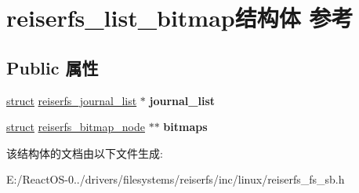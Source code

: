 \hypertarget{structreiserfs__list__bitmap}{}\section{reiserfs\+\_\+list\+\_\+bitmap结构体 参考}
\label{structreiserfs__list__bitmap}
\subsection*{Public 属性}
\begin{DoxyCompactItemize}
\item 
\mbox{\label{structreiserfs__list__bitmap_a3d0084a7cfe7cf371d6d21d65d39e612}} 
\hyperlink{interfacestruct}{struct} \hyperlink{structreiserfs__journal__list}{reiserfs\+\_\+journal\+\_\+list} $\ast$ {\bfseries journal\+\_\+list}
\item 
\mbox{\label{structreiserfs__list__bitmap_a760817c992d1deeb78b6bfe4c7ab2421}} 
\hyperlink{interfacestruct}{struct} \hyperlink{structreiserfs__bitmap__node}{reiserfs\+\_\+bitmap\+\_\+node} $\ast$$\ast$ {\bfseries bitmaps}
\end{DoxyCompactItemize}


该结构体的文档由以下文件生成\+:\begin{DoxyCompactItemize}
\item 
E\+:/\+React\+O\+S-\/0../drivers/filesystems/reiserfs/inc/linux/reiserfs\+\_\+fs\+\_\+sb.\+h\end{DoxyCompactItemize}
